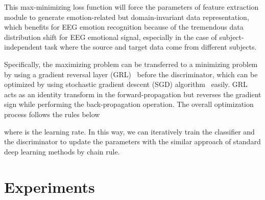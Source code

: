 \documentclass[journal]{IEEEtran}
\begin{document}
This max-minimizing loss function will force the parameters of feature extraction module to generate emotion-related but domain-invariant data representation, which benefits for EEG emotion recognition because of the tremendous data distribution shift for EEG emotional signal, especially in the case of subject-independent task where the source and target data come from different subjects.

Specifically, the maximizing problem can be transferred to a minimizing problem by using a gradient reversal layer (GRL)~\cite{ganin2016domain} before the discriminator, which can be optimized by using stochastic gradient
descent (SGD) algorithm~\cite{bottou2010large} easily. GRL acts as an identity transform in the forward-propagation but reverses the gradient sign while performing the back-propagation operation. The overall optimization process follows the rules below

where  is the learning rate. In this way, we can iteratively train the classifier and the discriminator to update the parameters with the similar approach of standard deep learning methods by chain rule.


\section{Experiments}
\label{Sec: Experiment}
\end{document}
